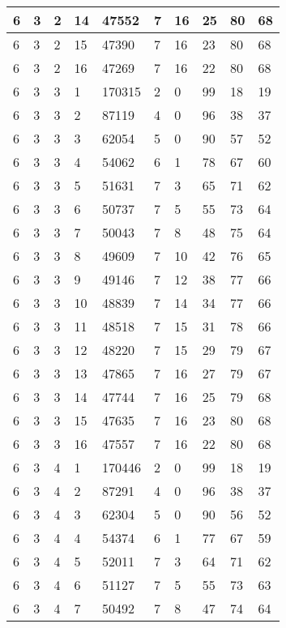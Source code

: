 \begin{table}[!ht]
\begin{tabular}{|l|l|l|l|l|l|l|l|l|l|}
        6 & 3 & 2 & 14 & 47552 & 7 & 16 & 25 & 80 & 68 \\ \hline
        6 & 3 & 2 & 15 & 47390 & 7 & 16 & 23 & 80 & 68 \\ \hline
        6 & 3 & 2 & 16 & 47269 & 7 & 16 & 22 & 80 & 68 \\ \hline
        6 & 3 & 3 & 1 & 170315 & 2 & 0 & 99 & 18 & 19 \\ \hline
        6 & 3 & 3 & 2 & 87119 & 4 & 0 & 96 & 38 & 37 \\ \hline
        6 & 3 & 3 & 3 & 62054 & 5 & 0 & 90 & 57 & 52 \\ \hline
        6 & 3 & 3 & 4 & 54062 & 6 & 1 & 78 & 67 & 60 \\ \hline
        6 & 3 & 3 & 5 & 51631 & 7 & 3 & 65 & 71 & 62 \\ \hline
        6 & 3 & 3 & 6 & 50737 & 7 & 5 & 55 & 73 & 64 \\ \hline
        6 & 3 & 3 & 7 & 50043 & 7 & 8 & 48 & 75 & 64 \\ \hline
        6 & 3 & 3 & 8 & 49609 & 7 & 10 & 42 & 76 & 65 \\ \hline
        6 & 3 & 3 & 9 & 49146 & 7 & 12 & 38 & 77 & 66 \\ \hline
        6 & 3 & 3 & 10 & 48839 & 7 & 14 & 34 & 77 & 66 \\ \hline
        6 & 3 & 3 & 11 & 48518 & 7 & 15 & 31 & 78 & 66 \\ \hline
        6 & 3 & 3 & 12 & 48220 & 7 & 15 & 29 & 79 & 67 \\ \hline
        6 & 3 & 3 & 13 & 47865 & 7 & 16 & 27 & 79 & 67 \\ \hline
        6 & 3 & 3 & 14 & 47744 & 7 & 16 & 25 & 79 & 68 \\ \hline
        6 & 3 & 3 & 15 & 47635 & 7 & 16 & 23 & 80 & 68 \\ \hline
        6 & 3 & 3 & 16 & 47557 & 7 & 16 & 22 & 80 & 68 \\ \hline
        6 & 3 & 4 & 1 & 170446 & 2 & 0 & 99 & 18 & 19 \\ \hline
        6 & 3 & 4 & 2 & 87291 & 4 & 0 & 96 & 38 & 37 \\ \hline
        6 & 3 & 4 & 3 & 62304 & 5 & 0 & 90 & 56 & 52 \\ \hline
        6 & 3 & 4 & 4 & 54374 & 6 & 1 & 77 & 67 & 59 \\ \hline
        6 & 3 & 4 & 5 & 52011 & 7 & 3 & 64 & 71 & 62 \\ \hline
        6 & 3 & 4 & 6 & 51127 & 7 & 5 & 55 & 73 & 63 \\ \hline
        6 & 3 & 4 & 7 & 50492 & 7 & 8 & 47 & 74 & 64 \\ \hline

\end{tabular}
\end{table}

